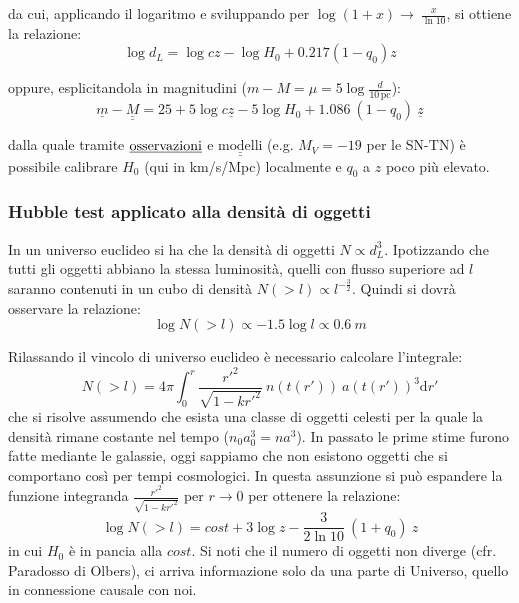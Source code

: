 da cui, applicando il logaritmo e sviluppando per \(\log\left(1+x\right)\rightarrow\ \frac{x}{\ln10}\), si
ottiene la relazione:
\begin{equation}
\log d_L = \log cz-\log H_0+0.217(1-q_0)z
\end{equation}

oppure, esplicitandola in magnitudini ($ m-M=\mu=5\log\frac{d}{\mathrm{10\,pc}} $):
\begin{equation}
\underline{m} - \underline{\underline{M}} = 25 + 5\log c\underline{z}-5\log H_0 + 1.086~(1-q_0)~\underline{z}
\end{equation}

dalla quale tramite $\textrm{\underline{osservazioni}}$ e $\underline{\underline{\textrm{modelli}}} $ (e.g. $M_V=-19$ per le SN-TN) è possibile calibrare $H_0$ (qui in km/s/Mpc) localmente e $q_0$ a $z$ poco più elevato.

\subsubsection{Hubble test applicato alla densità di oggetti}
In un universo euclideo si ha che la densità di oggetti $N\propto d_L^3$. Ipotizzando che tutti gli oggetti abbiano la stessa luminosità, quelli con flusso superiore ad $l$ saranno contenuti in un cubo di densità $N(>l)\propto l^{-\frac{3}{2}}$. Quindi si dovrà osservare la relazione: 
\begin{equation}
\log N(>l) \propto -1.5 \log l \propto 0.6~m
\end{equation}

Rilassando il vincolo di universo euclideo è necessario calcolare l'integrale:
\begin{equation}
N(>l)= 4\pi \int_{0}^{r}\frac{r'^2}{\sqrt{1-kr'^2}}~n(t(r'))~a(t(r'))^3 \mathrm{d}r'
\end{equation}
che si risolve assumendo che esista una classe di oggetti celesti per la quale la densità rimane costante nel tempo ($n_0a_0^3=na^3$). In passato le prime stime furono fatte mediante le galassie, oggi sappiamo che non esistono oggetti che si comportano così per tempi cosmologici.
In questa assunzione si può espandere la funzione integranda $\frac{r'^2}{\sqrt{1-kr'^2}}$ per $r\rightarrow 0$ per ottenere la relazione:
\begin{equation}
\log N(>l) = cost + 3\log z - \frac{3}{2\ln 10}~(1+q_0)~z
\end{equation}
in cui $H_0$ è in pancia alla $cost$. Si noti che il numero di oggetti non diverge (cfr. Paradosso di Olbers), ci arriva informazione solo da una parte di Universo, quello in connessione causale con noi.


